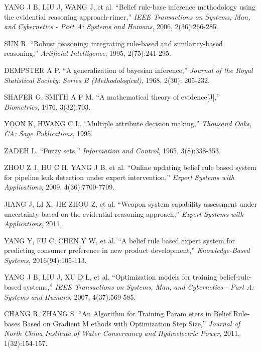 \documentclass{ieeeaccess}
\begin{document}
\begin{thebibliography}{00}

     YANG J B, LIU J, WANG J, et al. ``Belief rule-base inference methodology
    using the evidential reasoning approach-rimer,''
    \emph{IEEE Transactions on Systems, Man, and Cybernetics - Part A: Systems and Humans},
    2006, 2(36):266-285.

     SUN R. ``Robust reasoning: integrating rule-based and similarity-based
    reasoning,'' \emph{Artificial Intelligence},
    1995, 2(75):241-295.

     DEMPSTER A P. ``A generalization of bayesian inference,''
    \emph{Journal of the Royal Statistical Society: Series B (Methodological)},
    1968, 2(30): 205-232.

     SHAFER G, SMITH A F M. ``A mathematical theory of evidence[J],''
    \emph{Biometrics},
    1976, 3(32):703.

     YOON K, HWANG C L. ``Multiple attribute decision making,''
    \emph{Thousand Oaks, CA: Sage Publications},
    1995.

     ZADEH L. ``Fuzzy sets,''
    \emph{Information and Control},
    1965, 3(8):338-353.

     ZHOU Z J, HU C H, YANG J B, et al. ``Online updating belief rule based
    system for pipeline leak detection under expert intervention,''
    \emph{Expert Systems with Applications},
    2009, 4(36):7700-7709.

     JIANG J, LI X, JIE ZHOU Z, et al. ``Weapon system capability assessment
    under uncertainty based on the evidential reasoning approach,''
    \emph{Expert Systems with Applications},
    2011.

     YANG Y, FU C, CHEN Y W, et al. ``A belief rule based expert system
    for predicting consumer preference in new product development,''
    \emph{Knowledge-Based Systems},
    2016(94):105-113.

     YANG J B, LIU J, XU D L, et al. ``Optimization models for training
    belief-rule-based systems,''
    \emph{IEEE Transactions on Systems, Man, and Cybernetics - Part A: Systems and Humans},
    2007, 4(37):569-585.

     CHANG R, ZHANG S. ``An Algorithm for Training Param eters in Belief Rule-bases Based on
    Gradient M ethods with Optimization Step Size,''
    \emph{Journal of North China Institute of Water Conservancy and Hydroelectric Power},
    2011, 1(32):154-157.


\end{thebibliography}
\end{document}
